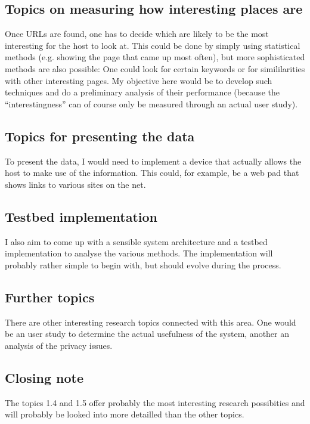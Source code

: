\documentclass[a4paper]{danarticle}
\begin{document}
      \subsection{Topics on measuring how interesting places are}
        Once URLs are found, one has to decide which are likely to be the most
	interesting for the host to look at. This could be done by simply using
	statistical methods (e.g. showing the page that came up most often),
	but more sophisticated methods are also possible: One could look for
	certain keywords or for simililarities with other interesting pages.
	My objective here would be to develop such techniques and do a
	preliminary analysis of their performance (because the
	"`interestingness"' can of course only be measured through an actual
	user study).
      \subsection*{Topics for presenting the data}
        To present the data, I would need to implement a device that actually
	allows the host to make use of the information. This could, for example,
	be a web pad that shows links to various sites on the net.
    \subsection{Testbed implementation}
      I also aim to come up with a sensible system architecture and a testbed
      implementation to analyse the various methods. The implementation will
      probably rather simple to begin with, but should evolve during the
      process. 
    \subsection{Further topics}
      There are other interesting research topics connected with this area. One
      would be an user study to determine the actual usefulness of the system,
      another an analysis of the privacy issues.
    \subsection{Closing note}
      The topics 1.4 and 1.5 offer probably the most interesting research
      possibities and will probably be looked into more detailled than the other
      topics.
\end{document}
